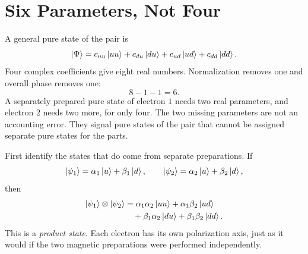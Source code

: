 \begin{classroomqa}
\end{classroomqa}

\begin{classroomqa}
\end{classroomqa}

\section{Six Parameters, Not Four}

A general pure state of the pair is
\begin{equation}
  \left\lvert\Psi\right\rangle
  =
  c_{uu}\left\lvert uu\right\rangle
  +c_{du}\left\lvert du\right\rangle
  +c_{ud}\left\lvert ud\right\rangle
  +c_{dd}\left\lvert dd\right\rangle.
  \label{eq:l04-general-two-spin-state}
\end{equation}
Four complex coefficients give eight real numbers. Normalization removes one and overall phase removes one:
\begin{equation}
  8-1-1=6.
  \label{eq:l04-two-spin-parameter-count}
\end{equation}
A separately prepared pure state of electron \(1\) needs two real parameters, and electron \(2\) needs two more, for only four. The two missing parameters are not an accounting error. They signal pure states of the pair that cannot be assigned separate pure states for the parts.

First identify the states that do come from separate preparations. If
\begin{equation}
  \left\lvert\psi_1\right\rangle=\alpha_1\left\lvert u\right\rangle+\beta_1\left\lvert d\right\rangle,
  \qquad
  \left\lvert\psi_2\right\rangle=\alpha_2\left\lvert u\right\rangle+\beta_2\left\lvert d\right\rangle,
\end{equation}
then
\begin{align}
  \left\lvert\psi_1\right\rangle\otimes\left\lvert\psi_2\right\rangle
  &=
  \alpha_1\alpha_2\left\lvert uu\right\rangle
  +\alpha_1\beta_2\left\lvert ud\right\rangle
  \notag\\
  &\quad
  +\beta_1\alpha_2\left\lvert du\right\rangle
  +\beta_1\beta_2\left\lvert dd\right\rangle.
  \label{eq:l04-product-expansion}
\end{align}
This is a \emph{product state}. Each electron has its own polarization axis, just as it would if the two magnetic preparations were performed independently.

